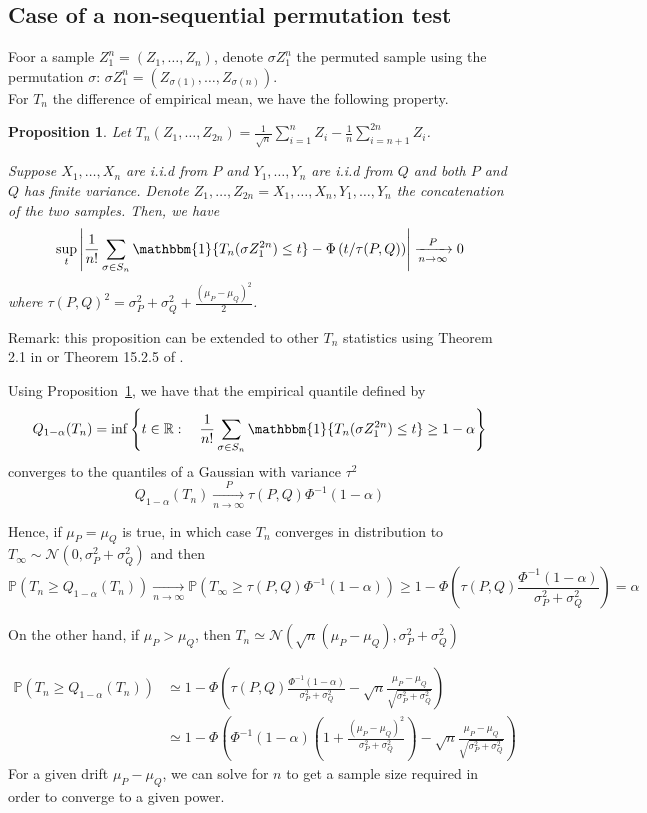 \documentclass{article}
\theoremstyle{plain}
\newtheorem{Proposition}{Proposition}
\theoremstyle{remark}
\renewcommand{\P}{\mathbb{P}}
\newcommand{\R}{\mathbb{R}}
\newcommand{\1}{\mathbbm{1}}
\numberwithin{equation}{section}
\begin{document}
\subsection{Case of a non-sequential permutation test}

Foor a sample $Z_1^n=(Z_1,\dots,Z_n)$, denote $\sigma Z_1^n$ the permuted sample using the permutation $\sigma$: $\sigma Z_1^n=(Z_{\sigma(1)},\dots,Z_{\sigma(n)})$.\\
For $T_n$ the difference of empirical mean, we have the following property.

\begin{Proposition}\label{prop:asym_perm_test}
Let $T_n(Z_1,\dots,Z_{2n})=\frac{1}{\sqrt{n}}\sum_{i=1}^n Z_i -\frac{1}{n}\sum_{i=n+1}^{2n} Z_i$.

Suppose $X_1,\dots,X_n$ are i.i.d from $P$ and $Y_1,\dots,Y_n$ are i.i.d from $Q$ and both $P$ and $Q$ has finite variance. Denote $Z_1,\dots,Z_{2n}=X_1,\dots,X_n, Y_1,\dots,Y_n$ the concatenation of the two samples. Then, we have
$$\sup_{t}\left|\frac{1}{n!}\sum_{\sigma \in S_n} \1\{T_n(\sigma Z_{1}^{2n}) \le t\}- \Phi\left(t/\tau(P,Q) \right)\right|\xrightarrow[n \to \infty]{P} 0$$
where $\tau(P,Q)^2=\sigma_P^2+\sigma_Q^2+\frac{(\mu_P- \mu_Q)^2}{2} $.
\end{Proposition}
Remark: this proposition can be extended to other $T_n$ statistics using Theorem 2.1 in \cite{Chung_2013} or Theorem 15.2.5 of \cite{lehmann2005testing}.

Using Proposition~\ref{prop:asym_perm_test}, we have that the empirical quantile defined by
$$Q_{1-\alpha}(T_n) = \inf\left\{t \in \R:\quad \frac{1}{n!}\sum_{\sigma \in S_n} \1\{T_n(\sigma Z_{1}^{2n}) \le t\} \ge 1-\alpha\right\} $$
converges to the quantiles of a Gaussian with variance $\tau^2$
$$Q_{1-\alpha}(T_n)\xrightarrow[n \to \infty]{P} \tau(P,Q)\Phi^{-1}(1-\alpha) $$

 Hence, if $\mu_P = \mu_Q$ is true, in which case $T_n$ converges in distribution to $T_\infty\sim \mathcal{N}(0,\sigma_P^2+\sigma_Q^2 )$ and then
$$\P\left( T_n \ge Q_{1-\alpha}(T_n)\right) \xrightarrow[n \to \infty]{} \P(T_\infty\ge \tau(P,Q)\Phi^{-1}(1-\alpha)) \ge  1-\Phi\left(\tau(P,Q)\frac{\Phi^{-1}(1-\alpha)}{\sigma_P^2+\sigma_Q^2 } \right)=\alpha  $$

On the other hand, if $\mu_P > \mu_Q$, then $T_n \simeq \mathcal{N}(\sqrt{n}(\mu_P-\mu_Q),\sigma_P^2+\sigma_Q^2 ) $

\begin{align*}
\P\left( T_n \ge Q_{1-\alpha}(T_n)\right)&\simeq  1-\Phi\left(\tau(P,Q)\frac{\Phi^{-1}(1-\alpha)}{\sigma_P^2+\sigma_Q^2 }-  \sqrt{n}\frac{\mu_P-\mu_Q}{\sqrt{\sigma_P^2+\sigma_Q^2}} \right)  \\
&\simeq  1-\Phi\left(\Phi^{-1}(1-\alpha)\left(1+\frac{(\mu_P-\mu_Q)^2}{\sigma_P^2+\sigma_Q^2 }\right)-  \sqrt{n}\frac{\mu_P-\mu_Q}{\sqrt{\sigma_P^2+\sigma_Q^2}} \right)
\end{align*}
For a given drift $\mu_P-\mu_Q$, we can solve for $n$ to get a sample size required in order to converge to a given power.
\end{document}
